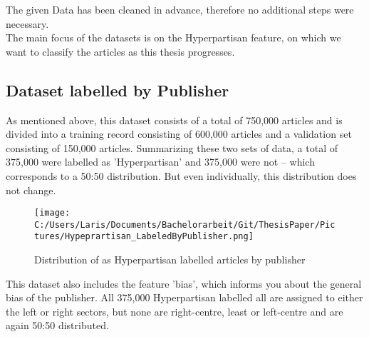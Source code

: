 \documentclass[a4paper, 11pt,titlepage,oneside,openany]{book}
\begin{document}
 \noindent The given Data has been cleaned in advance, therefore no additional steps were necessary.\\ 
 The main focus of the datasets is on the Hyperpartisan feature, on which we want to classify the articles as this thesis progresses.
 

\subsection{Dataset labelled by Publisher}
As mentioned above, this dataset consists of a total of 750,000 articles and is divided into a training record consisting of 600,000 articles and a validation set consisting of 150,000 articles. Summarizing these two sets of data, a total of 375,000 were labelled as 'Hyperpartisan' and 375,000 were not – which corresponds to a 50:50 distribution. But even individually, this distribution does not change. 
\begin{figure}[h]
	\centering
	\texttt{[image: C:/Users/Laris/Documents/Bachelorarbeit/Git/ThesisPaper/Pictures/Hypeprartisan\_LabeledByPublisher.png]}
	\caption{Distribution of as Hyperpartisan labelled articles by publisher}
	\label{fig:example}
\end{figure}

\noindent This dataset also includes the feature 'bias', which informs you about the general bias of the publisher. All 375,000 Hyperpartisan labelled all are assigned to either the left or right sectors, but none are right-centre, least or left-centre and are again 50:50 distributed.
\end{document}
